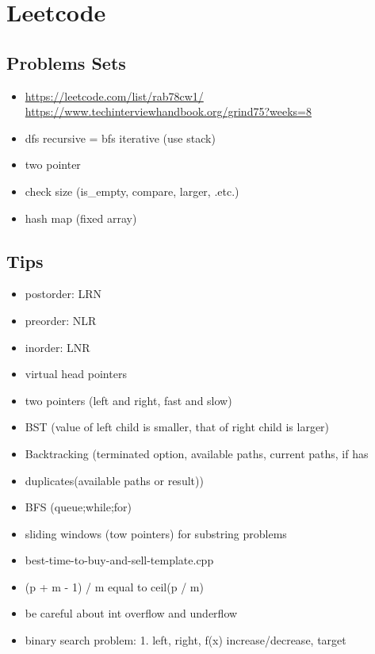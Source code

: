 \chapter{Leetcode}\label{chp:leetcode}
\minitoc

\section{Problems Sets}


\begin{itemize}
	\item \url{https://leetcode.com/list/rab78cw1/ https://www.techinterviewhandbook.org/grind75?weeks=8}
	\item dfs recursive = bfs iterative (use stack)
	\item two pointer
	\item check size (is\_empty, compare, larger, .etc.)
	\item hash map (fixed array)
\end{itemize}

\section{Tips}

\begin{itemize}
	\item postorder: LRN
	\item preorder: NLR
	\item inorder: LNR
	\item virtual head pointers
	\item two pointers (left and right, fast and slow)
	\item BST (value of left child is smaller, that of right child is larger)
	\item Backtracking (terminated option, available paths, current paths, if has
	\item duplicates(available paths or result))
	\item BFS (queue;while;for)
	\item sliding windows (tow pointers) for substring problems
	\item best-time-to-buy-and-sell-template.cpp
	\item (p + m - 1) / m equal to ceil(p / m)
	\item be careful about int overflow and underflow
	\item binary search problem: 1. left, right, f(x) increase/decrease, target
\end{itemize}

